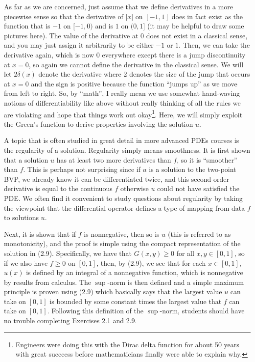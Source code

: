 \documentclass{amsart}
\theoremstyle{plain}
\theoremstyle{definition}
\theoremstyle{remark}
\theoremstyle{definition}
\numberwithin{equation}{section}
\numberwithin{equation}{section}
\newcommand{\abs}[1]{\left\vert#1\right\vert}
\begin{document}
As far as we are concerned, just assume that we define derivatives in a more piecewise sense so that the derivative of $\abs{x}$ on $[-1,1]$ does in fact exist as the function that is $-1$ on $[-1,0)$ and is $1$ on $(0,1]$ (it may be helpful to draw some pictures here).
The value of the derivative at $0$ does not exist in a classical sense, and you may just assign it arbitrarily to be either $-1$ or $1$. 
Then, we can take the derivative again, which is now $0$ everywhere except there is a jump discontinuity at $x=0$, so again we cannot define the derivative in the classical sense.
We will let $2\delta(x)$ denote the derivative where $2$ denotes the size of the jump that occurs at $x=0$ and the sign is positive because the function ``jumps up'' as we move from left to right. 
So, by ``math'', I really mean we use somewhat hand-waving notions of differentiability like above without really thinking of all the rules we are violating and hope that things work out okay\footnote{Engineers were doing this with the Dirac delta function for about 50 years with great succcess before mathematicians finally were able to explain why.}.
Here, we will simply exploit the Green's function to derive properties involving the solution $u$.

A topic that is often studied in great detail in more advanced PDEs courses is the regularity of a solution.
Regularity simply means smoothness.
It is first shown that a solution $u$ has at least two more derivatives than $f$, so it is ``smoother'' than $f$.
This is perhaps not surprising since if $u$ is a solution to the two-point BVP, we already know it can be differentiated twice, and this second-order derivative is equal to the continuous $f$ otherwise $u$ could not have satisfied the PDE. 
We often find it convenient to study questions about regularity by taking the viewpoint that the differential operator defines a type of mapping from data $f$ to solutions $u$. 

Next, it is shown that if $f$ is nonnegative, then so is $u$ (this is referred to as monotonicity), and the proof is simple using the compact representation of the solution in (2.9).
Specifically, we have that $G(x,y)\geq 0$ for all $x,y\in[0,1]$, so if we also have $f\geq 0$ on $[0,1]$, then, by (2.9), we see that for each $x\in[0,1]$, $u(x)$ is defined by an integral of a nonnegative function, which is nonnegative by results from calculus. 
The $\sup$-norm is then defined and a simple maximum principle is proven using (2.9) which basically says that the largest value $u$ can take on $[0,1]$ is bounded by some constant times the largest value that $f$ can take on $[0,1]$. 
Following this definition of the $\sup$-norm, students should have no trouble completing Exercises 2.1 and 2.9.
\end{document}
